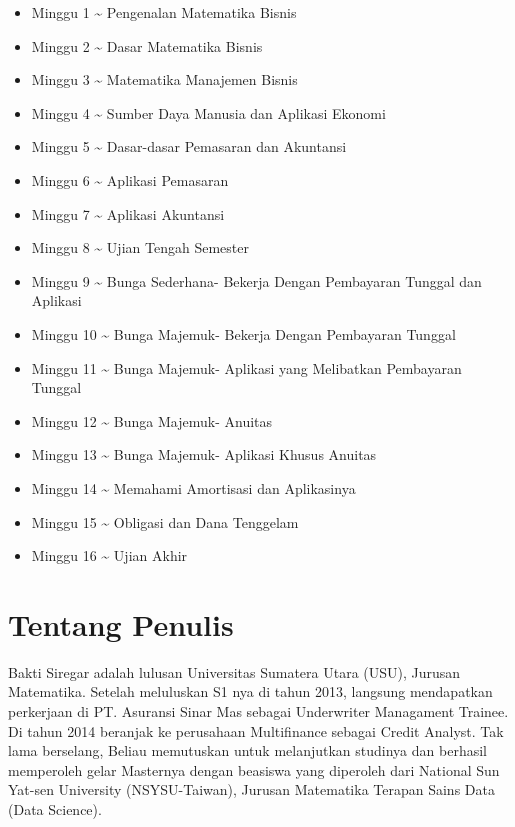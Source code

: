 \documentclass[
]{book}
\providecommand{\tightlist}{%
  \setlength{\itemsep}{0pt}\setlength{\parskip}{0pt}}
\begin{document}
\begin{itemize}
\tightlist
\item
  Minggu 1 \textasciitilde{} Pengenalan Matematika Bisnis
\item
  Minggu 2 \textasciitilde{} Dasar Matematika Bisnis
\item
  Minggu 3 \textasciitilde{} Matematika Manajemen Bisnis
\item
  Minggu 4 \textasciitilde{} Sumber Daya Manusia dan Aplikasi Ekonomi
\item
  Minggu 5 \textasciitilde{} Dasar-dasar Pemasaran dan Akuntansi
\item
  Minggu 6 \textasciitilde{} Aplikasi Pemasaran
\item
  Minggu 7 \textasciitilde{} Aplikasi Akuntansi
\item
  Minggu 8 \textasciitilde{} Ujian Tengah Semester
\item
  Minggu 9 \textasciitilde{} Bunga Sederhana- Bekerja Dengan Pembayaran Tunggal dan Aplikasi
\item
  Minggu 10 \textasciitilde{} Bunga Majemuk- Bekerja Dengan Pembayaran Tunggal
\item
  Minggu 11 \textasciitilde{} Bunga Majemuk- Aplikasi yang Melibatkan Pembayaran Tunggal
\item
  Minggu 12 \textasciitilde{} Bunga Majemuk- Anuitas
\item
  Minggu 13 \textasciitilde{} Bunga Majemuk- Aplikasi Khusus Anuitas
\item
  Minggu 14 \textasciitilde{} Memahami Amortisasi dan Aplikasinya
\item
  Minggu 15 \textasciitilde{} Obligasi dan Dana Tenggelam
\item
  Minggu 16 \textasciitilde{} Ujian Akhir
\end{itemize}

\hypertarget{tentang-penulis}{%
\section*{Tentang Penulis}\label{tentang-penulis}}

Bakti Siregar adalah lulusan Universitas Sumatera Utara (USU), Jurusan Matematika. Setelah meluluskan S1 nya di tahun 2013, langsung mendapatkan perkerjaan di PT. Asuransi Sinar Mas sebagai Underwriter Managament Trainee. Di tahun 2014 beranjak ke perusahaan Multifinance sebagai Credit Analyst. Tak lama berselang, Beliau memutuskan untuk melanjutkan studinya dan berhasil memperoleh gelar Masternya dengan beasiswa yang diperoleh dari National Sun Yat-sen University (NSYSU-Taiwan), Jurusan Matematika Terapan Sains Data (Data Science).
\end{document}

